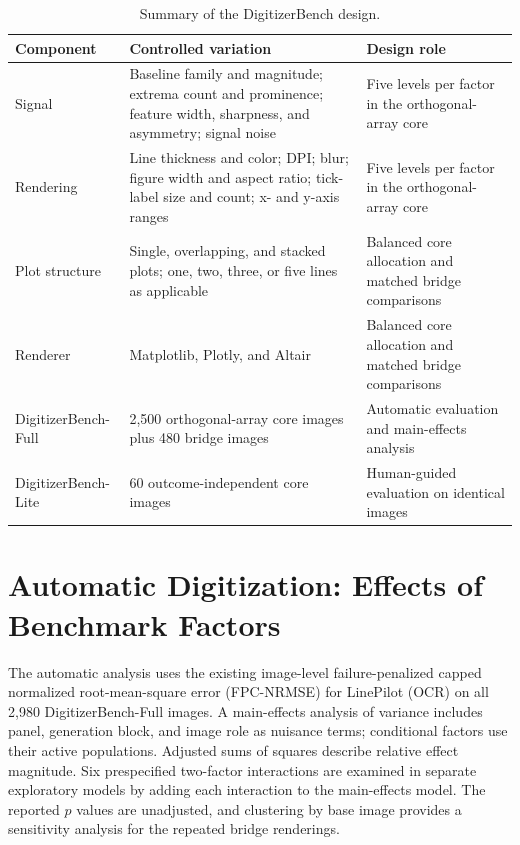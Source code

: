 \documentclass{article}
\begin{document}
\begin{table}[t]
\centering\small
\caption{Summary of the DigitizerBench design.}
\label{tab:design-summary}
\setlength{\tabcolsep}{5pt}
\begin{tabular}{@{}p{}p{}p{}@{}}
\toprule
Component & Controlled variation & Design role \\
\midrule
Signal & Baseline family and magnitude; extrema count and prominence; feature width, sharpness, and asymmetry; signal noise & Five levels per factor in the orthogonal-array core \\
Rendering & Line thickness and color; DPI; blur; figure width and aspect ratio; tick-label size and count; x- and y-axis ranges & Five levels per factor in the orthogonal-array core \\
Plot structure & Single, overlapping, and stacked plots; one, two, three, or five lines as applicable & Balanced core allocation and matched bridge comparisons \\
Renderer & Matplotlib, Plotly, and Altair & Balanced core allocation and matched bridge comparisons \\
DigitizerBench-Full & 2,500 orthogonal-array core images plus 480 bridge images & Automatic evaluation and main-effects analysis \\
DigitizerBench-Lite & 60 outcome-independent core images & Human-guided evaluation on identical images \\
\bottomrule
\end{tabular}
\end{table}

\section{Automatic Digitization: Effects of Benchmark Factors}
\label{sec:automatic-factors}

The automatic analysis uses the existing image-level failure-penalized capped normalized root-mean-square error (FPC-NRMSE) for LinePilot (OCR) on all 2,980 DigitizerBench-Full images. A main-effects analysis of variance includes panel, generation block, and image role as nuisance terms; conditional factors use their active populations. Adjusted sums of squares describe relative effect magnitude. Six prespecified two-factor interactions are examined in separate exploratory models by adding each interaction to the main-effects model. The reported $p$ values are unadjusted, and clustering by base image provides a sensitivity analysis for the repeated bridge renderings.
\end{document}
